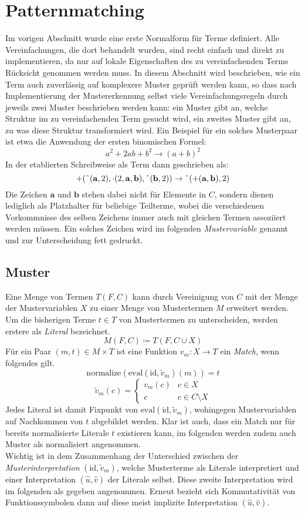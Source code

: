 \documentclass{article}
\begin{document}
\section{Patternmatching}
Im vorigen Abschnitt wurde eine erste Normalform für Terme definiert. Alle Vereinfachungen, die dort behandelt wurden, sind recht einfach und direkt zu implementieren, da nur auf lokale Eigenschaften des zu vereinfachenden Terms Rücksicht genommen werden muss. In diesem Abschnitt wird beschrieben, wie ein Term auch zuverlässig auf komplexere Muster geprüft werden kann, so dass nach Implementierung der Mustererkennung selbst viele Vereinfachungsregeln durch jeweils zwei Muster beschrieben werden kann: ein Muster gibt an, welche Struktur im zu vereinfachenden Term gesucht wird, ein zweites Muster gibt an, zu was diese Struktur transformiert wird. Ein Beispiel für ein solches Musterpaar ist etwa die Anwendung der ersten binomischen Formel:
$$a^2 + 2 a b + b^2 \rightarrow (a + b)^2$$
In der etablierten Schreibweise als Term dann geschrieben als:
$$+(\string^(\mathbf a, 2), \cdot(2, \mathbf a, \mathbf b), \string^(\mathbf b, 2)) \rightarrow \string^(+(\mathbf a, \mathbf b), 2)$$
Die Zeichen $\mathbf a$ und $\mathbf b$ stehen dabei nicht für Elemente in $C$, sondern dienen lediglich als Platzhalter für beliebige Teilterme, wobei die verschiedenen Vorkommnisse des selben Zeichens immer auch mit gleichen Termen assoziiert werden müssen. Ein solches Zeichen wird im folgenden \emph{Mustervariable} genannt und zur Unterscheidung fett gedruckt.

\subsection{Muster}
Eine Menge von Termen $T(F, C)$ kann durch Vereinigung von $C$ mit der Menge der Mustervariablen $X$ zu einer Menge von Mustertermen $M$ erweitert werden. 
Um die bisherigen Terme $t \in T$ von Mustertermen zu unterscheiden, werden erstere als \emph{Literal} bezeichnet.
$$M(F, C) \coloneqq T(F, C \cup X)$$
Für ein Paar $(m, t) \in M \times T$ ist eine Funktion $v_m \colon X \rightarrow T$ ein \emph{Match}, wenn folgendes gilt.
$$\mathrm{normalize}(\mathrm{eval}(\mathrm{id}, \tilde v_m)(m))= t$$
$$\tilde v_m(c) = \begin{cases}
	v_m(c) & c \in X\\
	c         & c \in C \setminus X
\end{cases}$$
Jedes Literal ist damit Fixpunkt von $\mathrm{eval}(\mathrm{id}, \tilde v_m)$, wohingegen Mustervariablen auf Nachkommen von $t$ abgebildet werden. 
Klar ist auch, dass ein Match nur für bereits normalisierte Literale $t$ existieren kann, im folgenden werden zudem auch Muster als normalisiert angenommen.\\
Wichtig ist in dem Zusammenhang der Unterschied zwischen der \emph{Musterinterpretation} $(\mathrm{id}, \tilde v_m)$, welche Musterterme als Literale interpretiert und einer Interpretation $(\hat{u}, \hat{v})$ der Literale selbst. Diese zweite Interpretation wird im folgenden als gegeben angenommen. Erneut bezieht sich Kommutativität von Funktionssymbolen dann auf diese meist implizite Interpretation $(\hat u, \hat v)$.\\
\end{document}

